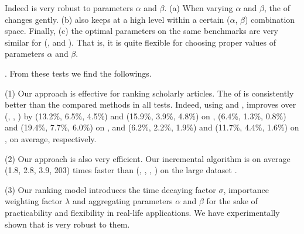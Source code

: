 Indeed \ensemblerank is very robust to parameters $\alpha$ and $\beta$.
(a) When varying $\alpha$ and $\beta$, the \PairAcc of \ensemblerank changes gently. (b) \PairAcc also keeps at a high level within a certain ($\alpha$, $\beta$)  combination space. Finally, (c) the optimal parameters on the same benchmarks are very similar for (\aan, \aminer and \magdata). That is, it is quite flexible for choosing proper values
of  parameters $\alpha$ and $\beta$.




.
From these tests we find the followings.


\noindent(1) Our approach \ensemblerank is effective for ranking scholarly articles. %
The \PairAcc of \ensemblerank is consistently better than the compared methods in all tests. Indeed, using \recom and \fcita, \ensemblerank improves \PairAcc over (\pagerank, \futurerank, \hhgrank) by
(13.2\%, 6.5\%, 4.5\%) and (15.9\%, 3.9\%, 4.8\%) on \aan,
(6.4\%, 1.3\%, 0.8\%) and (19.4\%, 7.7\%, 6.0\%) on \aminer, and
(6.2\%, 2.2\%, 1.9\%) and (11.7\%, 4.4\%, 1.6\%) on \magdata, on average, respectively.


\noindent(2) Our approach \ensemblerank is also very efficient.
%
Our incremental algorithm \incensemble is on average (1.8, 2.8, 3.9, 203) times faster than (\batensemble, \powensemble, \futurerank, \hhgrank)  on the large dataset \magdata.




\noindent(3) Our ranking model \ensemblerank introduces the time decaying factor $\sigma$, importance weighting factor $\lambda$ and aggregating parameters $\alpha$ and $\beta$ for the sake of practicability and flexibility in real-life applications. We have experimentally shown that \ensemblerank is very robust to them.


